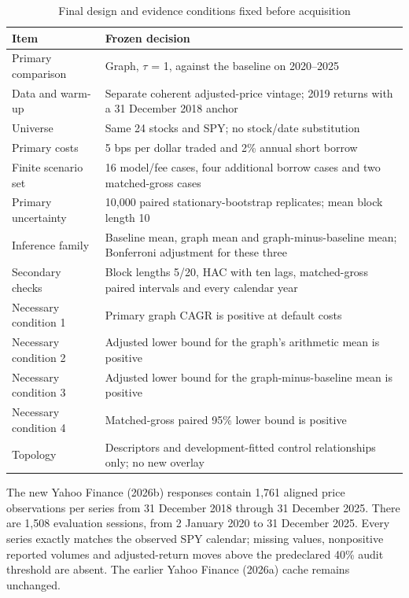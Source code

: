 \documentclass[12pt,a4paper,oneside]{article}
\begin{document}
\begin{table}[!htbp]
\centering
{}\fontsize{10}{12.5}\selectfont
\begin{tabular}{P{0.320000\dimexpr{}\tabcolsep\relax}P{0.680000\dimexpr{}\tabcolsep\relax}}
\toprule
{} \textbf{Item} & \textbf{Frozen decision} \\ \midrule
Primary comparison & Graph, \(\tau\) = 1, against the baseline on 2020–2025 \\
\midrule[0.2pt]
Data and warm-up & Separate coherent adjusted-price vintage; 2019 returns with a 31 December 2018 anchor \\
\midrule[0.2pt]
Universe & Same 24 stocks and SPY; no stock/date substitution \\
\midrule[0.2pt]
Primary costs & 5 bps per dollar traded and 2\% annual short borrow \\
\midrule[0.2pt]
Finite scenario set & 16 model/fee cases, four additional borrow cases and two matched-gross cases \\
\midrule[0.2pt]
Primary uncertainty & 10,000 paired stationary-bootstrap replicates; mean block length 10 \\
\midrule[0.2pt]
Inference family & Baseline mean, graph mean and graph-minus-baseline mean; Bonferroni adjustment for these three \\
\midrule[0.2pt]
Secondary checks & Block lengths 5/20, HAC with ten lags, matched-gross paired intervals and every calendar year \\
\midrule[0.2pt]
Necessary condition 1 & Primary graph CAGR is positive at default costs \\
\midrule[0.2pt]
Necessary condition 2 & Adjusted lower bound for the graph's arithmetic mean is positive \\
\midrule[0.2pt]
Necessary condition 3 & Adjusted lower bound for the graph-minus-baseline mean is positive \\
\midrule[0.2pt]
Necessary condition 4 & Matched-gross paired 95\% lower bound is positive \\
\midrule[0.2pt]
Topology & Descriptors and development-fitted control relationships only; no new overlay \\
\bottomrule
\end{tabular}
\caption{Final design and evidence conditions fixed before acquisition}\label{tab:18}
\end{table}
\endgroup

The new Yahoo Finance (2026b) responses contain 1,761 aligned price observations per series from 31 December 2018 through 31 December 2025. There are 1,508 evaluation sessions, from 2 January 2020 to 31 December 2025. Every series exactly matches the observed SPY calendar; missing values, nonpositive reported volumes and adjusted-return moves above the predeclared 40\% audit threshold are absent. The earlier Yahoo Finance (2026a) cache remains unchanged.
\end{document}
